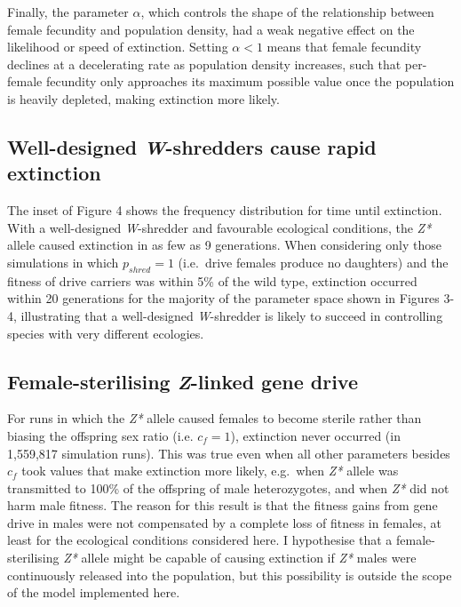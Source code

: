 \documentclass[]{rsos}%
\begin{document}
Finally, the parameter \(\alpha\), which controls the shape of the
relationship between female fecundity and population density, had a weak
negative effect on the likelihood or speed of extinction. Setting
\(\alpha < 1\) means that female fecundity declines at a decelerating
rate as population density increases, such that per-female fecundity
only approaches its maximum possible value once the population is
heavily depleted, making extinction more likely.

\hypertarget{well-designed-w-shredders-cause-rapid-extinction}{%
\subsection{\texorpdfstring{Well-designed \emph{W}-shredders cause rapid
extinction}{Well-designed W-shredders cause rapid extinction}}\label{well-designed-w-shredders-cause-rapid-extinction}}

The inset of Figure 4 shows the frequency distribution for time until
extinction. With a well-designed \emph{W}-shredder and favourable
ecological conditions, the \emph{Z*} allele caused extinction in as few
as 9 generations. When considering only those simulations in which
\(p_{shred} = 1\) (i.e.~drive females produce no daughters) and the
fitness of drive carriers was within 5\% of the wild type, extinction
occurred within 20 generations for the majority of the parameter space
shown in Figures 3-4, illustrating that a well-designed
\emph{W}-shredder is likely to succeed in controlling species with very
different ecologies.

\hypertarget{female-sterilising-z-linked-gene-drive}{%
\subsection{\texorpdfstring{Female-sterilising \emph{Z}-linked gene
drive}{Female-sterilising Z-linked gene drive}}\label{female-sterilising-z-linked-gene-drive}}

For runs in which the \emph{Z*} allele caused females to become sterile
rather than biasing the offspring sex ratio (i.e. \(c_f = 1\)),
extinction never occurred (in 1,559,817 simulation runs). This was true
even when all other parameters besides \(c_f\) took values that make
extinction more likely, e.g.~when \emph{Z*} allele was transmitted to
100\% of the offspring of male heterozygotes, and when \emph{Z*} did not
harm male fitness. The reason for this result is that the fitness gains
from gene drive in males were not compensated by a complete loss of
fitness in females, at least for the ecological conditions considered
here. I hypothesise that a female-sterilising \emph{Z*} allele might be
capable of causing extinction if \emph{Z*} males were continuously
released into the population, but this possibility is outside the scope
of the model implemented here.
\end{document}
